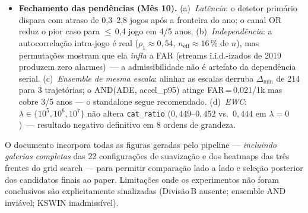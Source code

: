 \documentclass[11pt,a4paper]{article}
\begin{document}
\begin{itemize}[leftmargin=1.4em,itemsep=2pt]
          \texttt{max\_window}=2000) atinge
          $\text{FAR}_{2019}\!=\!0{,}042$/1k com cobertura 5/5 anos
          p\'os-2019 (IC Wilson 95\,\% =
          $[0{,}011;\,0{,}152]$/1k para $k\!=\!2$ alarmes em
          $n\!=\!48\,000$). A valida\c{c}\~ao com o ADWIN exato
          \cite{adwin} (implementa\c{c}\~ao \texttt{river}, re-grid
          independente) confirma o mesmo quadro qualitativo com
          $\text{FAR}_{2019}\!=\!0{,}125$/1k e cobertura 5/5.
          O ensemble AND temporal com Page-Hinkley
          agregado \'e \textbf{estruturalmente invi\'avel} a este n\'ivel
          (desalinhamento $\Delta_{\min}\!=\!214$ trajet\'orias entre os
          alarmes mais pr\'oximos --- maior que a janela
          $W_\text{coincidence}\!=\!200$ operacionalmente defens\'avel;
          cobertura $\geq$2/5 exigiria $W\!\geq\!10\,000$).
    \item \textbf{Fechamento das pend\^encias (M\^es 10).}
          (a)~\emph{Lat\^encia}: o detetor prim\'ario dispara com atraso
          de 0{,}3--2{,}8 jogos ap\'os a fronteira do ano; o canal OR
          reduz o pior caso para $\leq$\,0{,}4 jogo em 4/5 anos.
          (b)~\emph{Independ\^encia}: a autocorrela\c{c}\~ao intra-jogo
          \'e real ($\rho_1\!\approx\!0{,}54$, $n_\text{eff}\!\approx\!16\,\%$
          de $n$), mas permuta\c{c}\~oes mostram que ela \emph{infla} a
          FAR (streams i.i.d.-izados de 2019 produzem zero alarmes)~---
          a admissibilidade n\~ao \'e artefato da depend\^encia serial.
          (c)~\emph{Ensemble de mesma escala}: alinhar as escalas derruba
          $\Delta_{\min}$ de 214 para 3 trajet\'orias; o AND(ADE,
          accel\_p95) atinge FAR\,=\,0{,}021/1k mas cobre 3/5 anos ---
          o standalone segue recomendado.
          (d)~\emph{EWC}: $\lambda\!\in\!\{10^5,10^6,10^7\}$ n\~ao altera
          \texttt{cat\_ratio} ($0{,}449$--$0{,}452$ vs.\ $0{,}444$ em
          $\lambda\!=\!0$)~--- resultado negativo definitivo em 8 ordens
          de grandeza.
\end{itemize}

O documento incorpora todas as figuras geradas pelo pipeline ---
\emph{incluindo galerias completas} das 22 configura\c{c}\~oes de
suaviza\c{c}\~ao e dos heatmaps das tr\^es frentes do grid search ---
para permitir compara\c{c}\~ao lado a lado e sele\c{c}\~ao posterior dos
candidatos finais ao paper. Limita\c{c}\~oes onde os experimentos
n\~ao foram conclusivos s\~ao explicitamente sinalizadas
(Divis\~ao\,B ausente; ensemble AND invi\'avel; KSWIN inadmiss\'ivel).
\end{document}

